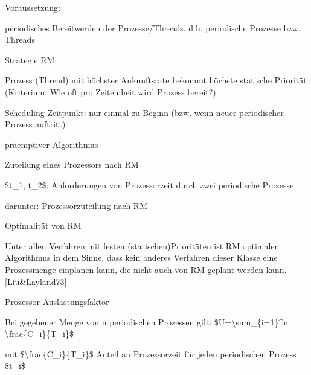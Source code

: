 \documentclass[a4paper]{article}
\begin{document}
\begin{multicols}{3}
    \begin{itemize*}
        \item
        Voraussetzung:
        \begin{itemize*}
            \item periodisches Bereitwerden der Prozesse/Threads, d.h. periodische Prozesse bzw. Threads
        \end{itemize*}
        \item
        Strategie RM:
        \begin{itemize*}
            \item Prozess (Thread) mit höchster Ankunftsrate bekommt höchste statische Priorität (Kriterium: Wie oft pro Zeiteinheit wird Prozess bereit?)
            \item Scheduling-Zeitpunkt: nur einmal zu Beginn (bzw. wenn neuer periodischer Prozess auftritt)
            \item präemptiver Algorithmus
        \end{itemize*}
        \item
        \begin{itemize*}
            \item Zuteilung eines Prozessors nach RM
            \item \$t\_1, t\_2\$: Anforderungen von Prozessorzeit durch zwei periodische Prozesse
            \item darunter: Prozessorzuteilung nach RM
        \end{itemize*}
        \item
        Optimalität von RM
        \begin{itemize*}
            \item Unter allen Verfahren mit festen (statischen)Prioritäten ist RM optimaler Algorithmus in dem Sinne, dass kein anderes Verfahren dieser Klasse eine Prozessmenge einplanen kann, die nicht auch von RM geplant werden kann. {[}Liu\&Layland73{]}
        \end{itemize*}
        \item
        Prozessor-Auslastungsfaktor
        \begin{itemize*}
            \item Bei gegebener Menge von n periodischen Prozessen gilt: \$U=\textbackslash sum\_\{i=1\}\^{}n \textbackslash frac\{C\_i\}\{T\_i\}\$
            \item mit \$\textbackslash frac\{C\_i\}\{T\_i\}\$ Anteil an Prozessorzeit für jeden periodischen Prozess \$t\_i\$

\end{itemize*}
\end{itemize*}
\end{multicols}
\end{document}
